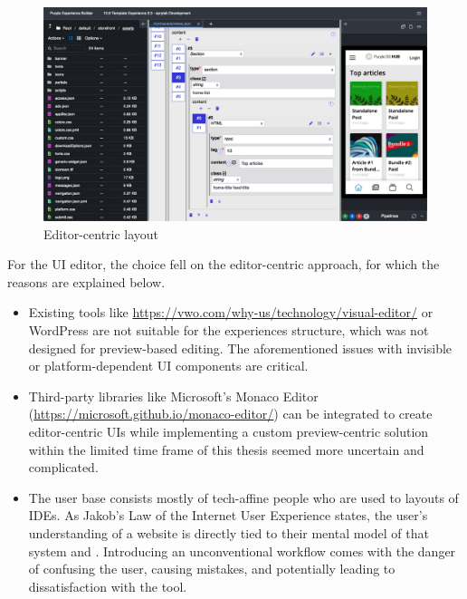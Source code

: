 \begin{figure}[h!]
  \includegraphics[width=\textwidth]{pics/editor-centric-screenshot.png}
  \caption{Editor-centric layout}
  \label{fig:editor-centric}
\end{figure}
\bigskip

For the UI editor, the choice fell on the editor-centric approach, for which the reasons are explained below.
\begin{itemize}
  \item Existing tools like \url{https://vwo.com/why-us/technology/visual-editor/} or WordPress are not suitable for the \Gls{experience}s structure, which was not designed for preview-based editing. The aforementioned issues with invisible or platform-dependent UI components are critical.
  \item Third-party libraries like Microsoft's Monaco Editor (\url{https://microsoft.github.io/monaco-editor/}) can be integrated to create editor-centric UIs while implementing a custom preview-centric solution within the limited time frame of this thesis seemed more uncertain and complicated.
  \item The user base consists mostly of tech-affine people who are used to layouts of IDEs. As Jakob's Law of the Internet User Experience states, the user's understanding of a website is directly tied to their mental model of that system \cite{Nielsen:2000} and \cite[p. 2]{LawsOfUX:2020ys}. Introducing an unconventional workflow comes with the danger of confusing the user, causing mistakes, and potentially leading to dissatisfaction with the tool.
\end{itemize}


